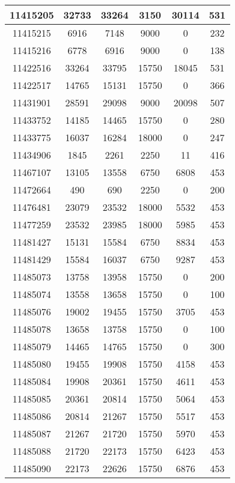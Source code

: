 \begin{appendices}
\begin{center}
\begin{longtable}{|c|c|c|c|c|c|}
11415205 & 32733 & 33264 & 3150  & 30114 & 531 \\ \hline
11415215 & 6916  & 7148  & 9000  & 0     & 232 \\ \hline
11415216 & 6778  & 6916  & 9000  & 0     & 138 \\ \hline
11422516 & 33264 & 33795 & 15750 & 18045 & 531 \\ \hline
11422517 & 14765 & 15131 & 15750 & 0     & 366 \\ \hline
11431901 & 28591 & 29098 & 9000  & 20098 & 507 \\ \hline
11433752 & 14185 & 14465 & 15750 & 0     & 280 \\ \hline
11433775 & 16037 & 16284 & 18000 & 0     & 247 \\ \hline
11434906 & 1845  & 2261  & 2250  & 11    & 416 \\ \hline
11467107 & 13105 & 13558 & 6750  & 6808  & 453 \\ \hline
11472664 & 490   & 690   & 2250  & 0     & 200 \\ \hline
11476481 & 23079 & 23532 & 18000 & 5532  & 453 \\ \hline
11477259 & 23532 & 23985 & 18000 & 5985  & 453 \\ \hline
11481427 & 15131 & 15584 & 6750  & 8834  & 453 \\ \hline
11481429 & 15584 & 16037 & 6750  & 9287  & 453 \\ \hline
11485073 & 13758 & 13958 & 15750 & 0     & 200 \\ \hline
11485074 & 13558 & 13658 & 15750 & 0     & 100 \\ \hline
11485076 & 19002 & 19455 & 15750 & 3705  & 453 \\ \hline
11485078 & 13658 & 13758 & 15750 & 0     & 100 \\ \hline
11485079 & 14465 & 14765 & 15750 & 0     & 300 \\ \hline
11485080 & 19455 & 19908 & 15750 & 4158  & 453 \\ \hline
11485084 & 19908 & 20361 & 15750 & 4611  & 453 \\ \hline
11485085 & 20361 & 20814 & 15750 & 5064  & 453 \\ \hline
11485086 & 20814 & 21267 & 15750 & 5517  & 453 \\ \hline
11485087 & 21267 & 21720 & 15750 & 5970  & 453 \\ \hline
11485088 & 21720 & 22173 & 15750 & 6423  & 453 \\ \hline
11485090 & 22173 & 22626 & 15750 & 6876  & 453 \\ \hline

\end{longtable}
\end{center}
\end{appendices}
